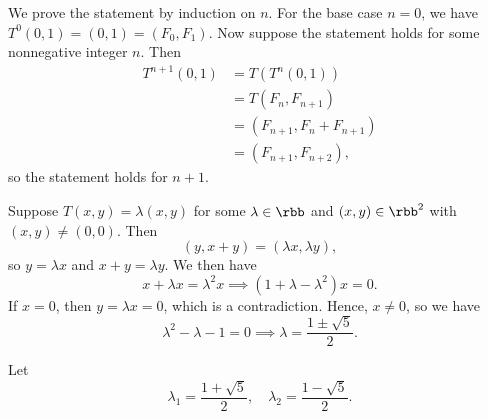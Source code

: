 \begin{solenum}
    \item We prove the statement by induction on $n$.
    For the base case $n = 0$, we have $T^0(0, 1) = (0, 1) = (F_0, F_1)$.
    Now suppose the statement holds for some nonnegative integer $n$.
    Then
    \begin{align*}
        T^{n+1}(0, 1) &= T(T^n(0, 1)) \\
        &= T(F_n, F_{n+1}) \\
        &= (F_{n+1}, F_n + F_{n+1}) \\
        &= (F_{n+1}, F_{n+2}),
    \end{align*}
    so the statement holds for $n + 1$.
    \item Suppose $T(x, y) = \lambda (x, y)$ for some $\lambda \in \rbb$ and $(x, y) \in \rbb^2$ with $(x, y) \neq (0, 0)$.
    Then
    \[
        (y, x + y) = (\lambda x, \lambda y),
    \]
    so $y = \lambda x$ and $x + y = \lambda y$.
    We then have
    \[
        x + \lambda x = \lambda^2 x \implies (1 + \lambda - \lambda^2)x = 0.
    \]
    If $x = 0$, then $y = \lambda x = 0$, which is a contradiction.
    Hence, $x \neq 0$, so we have
    \[
        \lambda^2 - \lambda - 1 = 0 \implies \lambda = \frac{1 \pm \sqrt{5}}{2}.
    \]
    \item Let
    \[
        \lambda_1 = \frac{1 + \sqrt{5}}{2}, \quad \lambda_2 = \frac{1 - \sqrt{5}}{2}.
    \]


\end{solenum}
